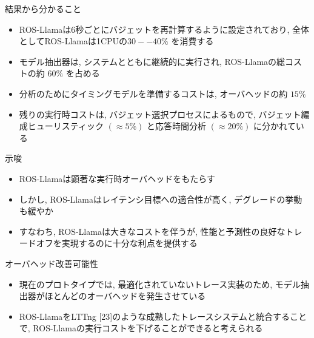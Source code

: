\begin{frame}{結果から分かること}
    \begin{itemize}
        \item ROS-Llamaは6秒ごとにバジェットを再計算するように設定されており, 全体としてROS-Llamaは1CPUの$30--40 \%$ を消費する
        \item モデル抽出器は, システムとともに継続的に実行され, ROS-Llamaの総コストの約 $60 \%$ を占める
        \item 分析のためにタイミングモデルを準備するコストは, オーバヘッドの約 $15 \%$
        \item 残りの実行時コストは, バジェット選択プロセスによるもので, バジェット編成ヒューリスティック $(\approx 5 \%)$ と応答時間分析 $(\approx 20 \%)$ に分かれている
    \end{itemize}
\end{frame}

\begin{frame}{示唆}
    \begin{itemize}
        \item ROS-Llamaは顕著な実行時オーバヘッドをもたらす
        \item しかし, ROS-Llamaはレイテンシ目標への適合性が高く, デグレードの挙動も緩やか
        \item すなわち, ROS-Llamaは大きなコストを伴うが, 性能と予測性の良好なトレードオフを実現するのに十分な利点を提供する
    \end{itemize}
\end{frame}

\begin{frame}{オーバヘッド改善可能性}
    \begin{itemize}
        \item 現在のプロトタイプでは, 最適化されていないトレース実装のため, モデル抽出器がほとんどのオーバヘッドを発生させている
        \item ROS-LlamaをLTTng [23]のような成熟したトレースシステムと統合することで, ROS-Llamaの実行コストを下げることができると考えられる
    \end{itemize}
\end{frame}
